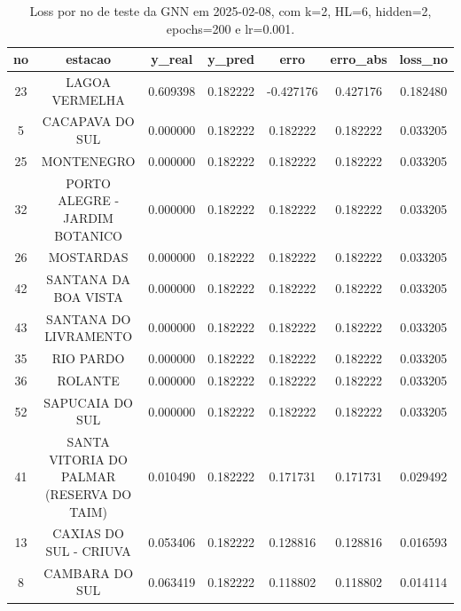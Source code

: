 \begin{table}[h]
\centering
\caption{Loss por no de teste da GNN em 2025-02-08, com k=2, HL=6, hidden=2, epochs=200 e lr=0.001.}
\label{tab:gnn_loss_k2_hl6_h2_e200_d20250208}
\begin{tabular}{ccccccc}
\toprule
no & estacao & y\_real & y\_pred & erro & erro\_abs & loss\_no \\
\midrule
23 & LAGOA VERMELHA & 0.609398 & 0.182222 & -0.427176 & 0.427176 & 0.182480 \\
5 & CACAPAVA DO SUL & 0.000000 & 0.182222 & 0.182222 & 0.182222 & 0.033205 \\
25 & MONTENEGRO & 0.000000 & 0.182222 & 0.182222 & 0.182222 & 0.033205 \\
32 & PORTO ALEGRE - JARDIM BOTANICO & 0.000000 & 0.182222 & 0.182222 & 0.182222 & 0.033205 \\
26 & MOSTARDAS & 0.000000 & 0.182222 & 0.182222 & 0.182222 & 0.033205 \\
42 & SANTANA DA BOA VISTA & 0.000000 & 0.182222 & 0.182222 & 0.182222 & 0.033205 \\
43 & SANTANA DO LIVRAMENTO & 0.000000 & 0.182222 & 0.182222 & 0.182222 & 0.033205 \\
35 & RIO PARDO & 0.000000 & 0.182222 & 0.182222 & 0.182222 & 0.033205 \\
36 & ROLANTE & 0.000000 & 0.182222 & 0.182222 & 0.182222 & 0.033205 \\
52 & SAPUCAIA DO SUL & 0.000000 & 0.182222 & 0.182222 & 0.182222 & 0.033205 \\
41 & SANTA VITORIA DO PALMAR (RESERVA DO TAIM) & 0.010490 & 0.182222 & 0.171731 & 0.171731 & 0.029492 \\
13 & CAXIAS DO SUL - CRIUVA & 0.053406 & 0.182222 & 0.128816 & 0.128816 & 0.016593 \\
8 & CAMBARA DO SUL & 0.063419 & 0.182222 & 0.118802 & 0.118802 & 0.014114 \\
\bottomrule
\end{tabular}
\end{table}
